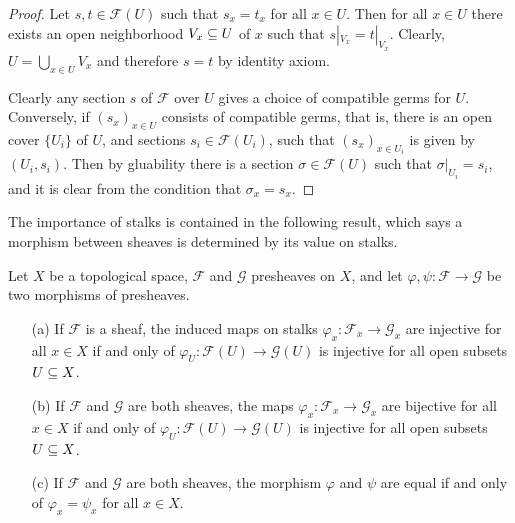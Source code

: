 \begin{proof}
Let $s,t\in\mathscr{F}(U)$ such that $s_x=t_x$ for all $x\in U$. Then for all $x\in U$ there exists an open neighborhood $V_x\subseteq U$ of $x$ such that $s|_{V_x}=t|_{V_x}$. Clearly, $U=\bigcup_{x\in U}V_x$ and therefore $s=t$ by identity axiom.\par
Clearly any section $s$ of $\mathscr{F}$ over $U$ gives a choice of compatible germs for $U$. Conversely, if $(s_x)_{x\in U}$ consists of compatible germs, that is, there is an open cover $\{U_i\}$ of $U$, and sections $s_i\in\mathscr{F}(U_i)$, such that $(s_x)_{x\in U_i}$ is given by $(U_i,s_i)$. Then by gluability there is a section $\sigma\in\mathscr{F}(U)$ such that $\sigma|_{U_i}=s_i$, and it is clear from the condition that $\sigma_x=s_x$.
\end{proof}
The importance of stalks is contained in the following result, which says a morphism between sheaves is determined by its value on stalks.
\begin{proposition}\label{sheaf morphism prop iff stalk prop}
Let $X$ be a topological space, $\mathscr{F}$ and $\mathscr{G}$ presheaves on $X$, and let $\varphi,\psi:\mathscr{F}\to\mathscr{G}$ be two morphisms of presheaves.
\begin{itemize}
\item[(a)] If $\mathscr{F}$ is a sheaf, the induced maps on stalks $\varphi_x:\mathscr{F}_x\to\mathscr{G}_x$ are injective for all $x\in X$ if and only of $\varphi_U:\mathscr{F}(U)\to\mathscr{G}(U)$ is injective for all open subsets $U\subseteq X$.
\item[(b)] If $\mathscr{F}$ and $\mathscr{G}$ are both sheaves, the maps $\varphi_x:\mathscr{F}_x\to\mathscr{G}_x$ are bijective for all $x\in X$ if and only of $\varphi_U:\mathscr{F}(U)\to\mathscr{G}(U)$ is injective for all open subsets $U\subseteq X$.
\item[(c)] If $\mathscr{F}$ and $\mathscr{G}$ are both sheaves, the morphism $\varphi$ and $\psi$ are equal if and only of $\varphi_x=\psi_x$ for all $x\in X$.
\end{itemize}
\end{proposition}
